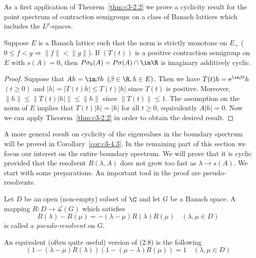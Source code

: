 As a first application of Theorem~\ref{thm:c3-2.2} we prove a cyclicity result for the point spectrum of contraction semigroups on a class of Banach lattices which includes the $L^p$-spaces.

\begin{corollary}\label{cor:c3-2.3}
	Suppose $E$ is a Banach lattice such that the norm is strictly monotone on $E_{+}$ (\ie  $0 \leq f < g \Rightarrow \|f\| < \|g\|$).
	If $(T(t))$ is a positive contraction semigroup on $E$ with $s(A) = 0$, then $P\sigma_{b}(A) = P\sigma(A) \cap \im\R $ is imaginary additively cyclic.
\end{corollary}

\begin{proof}
	Suppose that $Ah = \im\beta  h$ $(\beta \in \R , h \in E)$.
	Then we have $T(t)h = \mathrm{e}^{\im\beta  t}h$ $(t \geq 0)$ and $|h| = |T(t)h| \leq T(t)|h|$ since $T(t)$ is positive.
	Moreover, $\|h\| \leq \|T(t)|h|\| \leq \|h\|$ since $\|T(t)\| \leq 1$.
	The assumption on the norm of $E$ implies that $T(t)|h| = |h|$ for all $t \geq 0$, equivalently $A|h| = 0$.
	Now we can apply Theorem~\ref{thm:c3-2.2} in order to obtain the desired result.
\end{proof}
%
A more general result on cyclicity of the eigenvalues in the boundary spectrum will be proved in Corollary~\ref{cor:c3-4.3}.
In the remaining part of this section we focus our interest on the entire boundary spectrum.
We will prove that it is cyclic provided that the resolvent $R(\lambda,A)$ does not grow too fast as $\lambda \to s(A)$.
We start with some preparations.
An important tool in the proof are pseudo-resolvents.

\begin{definition}\label{def:c3-2.4}
	Let $D$ be an open (non-empty) subset of $\C $ and let $G$ be a Banach space.
	A mapping $R \colon D \to \mathcal{L}(G)$ which satisfies
	\begin{equation}\label{eq:c3-2.8}
		R(\lambda) - R(\mu) = -(\lambda - \mu)R(\lambda)R(\mu) \quad (\lambda,\mu \in D)
	\end{equation}
	is called a \emph{pseudo-resolvent} on $G$.
\end{definition}

An equivalent (often quite useful) version of (2.8) is the following
\begin{equation}\label{eq:c3-2.9}
	(1 - (\lambda - \mu)R(\lambda))(1 - (\mu - \lambda)R(\mu)) = 1 \quad (\lambda,\mu \in D)
\end{equation}

